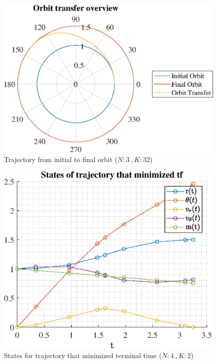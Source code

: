 \documentclass[]{article}
\begin{document}
	\begin{figure}
		\centering
		\includegraphics[scale=0.75]{orbit_N3_K32_C3_tf.eps}
		\caption{Trajectory from initial to final orbit (\(N:3\ , K:32\))}
		\label{fig:orbit_N3_K32_C3_tf}
	\end{figure}
	\begin{figure}
		\centering
		\includegraphics[scale=0.75]{states_N4_K2_C3_tf.eps}
		\caption{States for trajectory that minimized terminal time (\(N:4\ , K:2\))}
		\label{fig:states_N4_K2_C3_tf}
	\end{figure}
\end{document}
